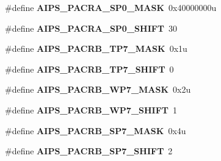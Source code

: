 \begin{DoxyCompactItemize}
\item 
\hypertarget{group___a_i_p_s___register___masks_ga11109b3502f454b24cff8a1de4f0c5eb}{}\#define {\bfseries A\+I\+P\+S\+\_\+\+P\+A\+C\+R\+A\+\_\+\+S\+P0\+\_\+\+M\+A\+S\+K}~0x40000000u\label{group___a_i_p_s___register___masks_ga11109b3502f454b24cff8a1de4f0c5eb}

\item 
\hypertarget{group___a_i_p_s___register___masks_ga7a99d46f8a65968fe1ec041bb24e4643}{}\#define {\bfseries A\+I\+P\+S\+\_\+\+P\+A\+C\+R\+A\+\_\+\+S\+P0\+\_\+\+S\+H\+I\+F\+T}~30\label{group___a_i_p_s___register___masks_ga7a99d46f8a65968fe1ec041bb24e4643}

\item 
\hypertarget{group___a_i_p_s___register___masks_ga61f0e0ca0fc547d6d16b82b809ec68e6}{}\#define {\bfseries A\+I\+P\+S\+\_\+\+P\+A\+C\+R\+B\+\_\+\+T\+P7\+\_\+\+M\+A\+S\+K}~0x1u\label{group___a_i_p_s___register___masks_ga61f0e0ca0fc547d6d16b82b809ec68e6}

\item 
\hypertarget{group___a_i_p_s___register___masks_ga74127c75240a56d4ab6fc6ec9e9c3e3d}{}\#define {\bfseries A\+I\+P\+S\+\_\+\+P\+A\+C\+R\+B\+\_\+\+T\+P7\+\_\+\+S\+H\+I\+F\+T}~0\label{group___a_i_p_s___register___masks_ga74127c75240a56d4ab6fc6ec9e9c3e3d}

\item 
\hypertarget{group___a_i_p_s___register___masks_ga529288b923e8b8681636ae6c62b68f6b}{}\#define {\bfseries A\+I\+P\+S\+\_\+\+P\+A\+C\+R\+B\+\_\+\+W\+P7\+\_\+\+M\+A\+S\+K}~0x2u\label{group___a_i_p_s___register___masks_ga529288b923e8b8681636ae6c62b68f6b}

\item 
\hypertarget{group___a_i_p_s___register___masks_gad75b032ecf59e1f8b6140a6928f9c73d}{}\#define {\bfseries A\+I\+P\+S\+\_\+\+P\+A\+C\+R\+B\+\_\+\+W\+P7\+\_\+\+S\+H\+I\+F\+T}~1\label{group___a_i_p_s___register___masks_gad75b032ecf59e1f8b6140a6928f9c73d}

\item 
\hypertarget{group___a_i_p_s___register___masks_ga33ad587b770fafb9d4eb30195bce757d}{}\#define {\bfseries A\+I\+P\+S\+\_\+\+P\+A\+C\+R\+B\+\_\+\+S\+P7\+\_\+\+M\+A\+S\+K}~0x4u\label{group___a_i_p_s___register___masks_ga33ad587b770fafb9d4eb30195bce757d}

\item 
\hypertarget{group___a_i_p_s___register___masks_ga3f1dc5da13c918207fb4736f45054292}{}\#define {\bfseries A\+I\+P\+S\+\_\+\+P\+A\+C\+R\+B\+\_\+\+S\+P7\+\_\+\+S\+H\+I\+F\+T}~2\label{group___a_i_p_s___register___masks_ga3f1dc5da13c918207fb4736f45054292}


\end{DoxyCompactItemize}
